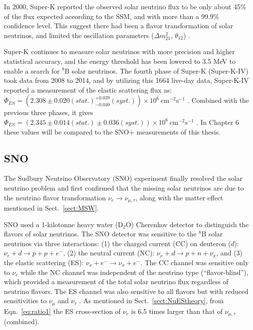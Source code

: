 In 2000, Super-K reported the observed solar neutrino flux to be only about 45\% of the flux expected according to the SSM, and with more than a 99.9\% confidence level. This suggest there had been a flavor transformation of solar neutrinos, and limited the oscillation parameters ($\Delta m^2_{21}$, $\theta_{12}$) \cite{superKwebsite}. 

Super-K continues to measure solar neutrinos with more precision and higher statistical accuracy, and the energy threshold has been lowered to 3.5 MeV to enable a search for $^8$B solar neutrinos. The fourth phase of Super-K (Super-K-IV) took data from 2008 to 2014, and by utilizing this 1664 live-day data, Super-K-IV reported a measurement of the elastic scattering flux as: $\Phi_{ES}=(2.308\pm0.020(stat.)^{+0.039}_{-0.040}(syst.))\times 10^6~\mathrm{cm^{-2}s^{-1}}$ \cite{abe2016solar}. Combined with the previous three phases, it gives $\Phi_{ES}=(2.345\pm0.014(stat.)\pm 0.036(syst.))\times 10^6~\mathrm{cm^{-2}s^{-1}}$ \cite{abe2016solar}. In Chapter 6 these values will be compared to the SNO+ measurements of this thesis.

\subsection{SNO}

The Sudbury Neutrino Observatory (SNO) experiment finally resolved the solar neutrino problem and first confirmed that the missing solar neutrinos are due to the neutrino flavor transformation $\nu_e\to\nu_{\mu,\tau}$, along with the matter effect mentioned in Sect.~\ref{sect:MSW}. 

SNO used a 1-kilotonne heavy water (D$_2$O) Cherenkov detector to distinguish the flavors of solar neutrinos. The SNO detector was sensitive to the $^8$B solar neutrinos via three interactions: (1) the charged current (CC) on deuteron ($d$): $\nu_e+d\to p+p+e^-$, (2) the neutral current (NC): $\nu_x+d\to p+n+\nu_x$, and (3) the elastic scattering (ES): $\nu_x+e^-\to \nu_x+e^-$. The CC channel was sensitive only to $\nu_e$ while the NC channel was independent of the neutrino type (``flavor-blind''), which provided a measurement of the total solar neutrino flux regardless of neutrino flavors. The ES channel was also sensitive to all flavors but with reduced sensitivities to $\nu_\mu$ and $\nu_\tau$ \cite{ahmad2002direct}. As mentioned in Sect.~\ref{sect:NuEStheory}, from Eqn.~\ref{eq:ratio1} the ES cross-section of $\nu_e$ is 6.5 times larger than that of $\nu_{\mu,\tau}$ (combined). 


